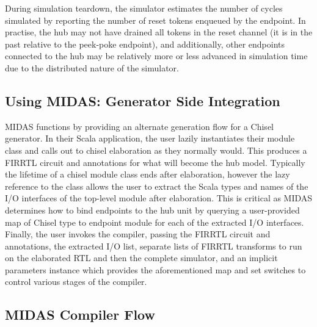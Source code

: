 During simulation teardown, the simulator estimates the number of cycles simulated by
reporting the number of reset tokens enqueued by the endpoint. In practise,
the hub may not have drained all tokens in the reset channel (it is in the
past relative to the peek-poke endpoint), and additionally, other endpoints
connected to the hub may be relatively more or less advanced in simulation
time due to the distributed nature of the simulator.

\subsection{Using MIDAS: Generator Side Integration}

MIDAS functions by providing an alternate generation flow for a Chisel
generator.  In their Scala application, the user lazily instantiates their
module class and calls out to chisel elaboration as they normally would.
This produces a FIRRTL circuit and annotations for what will become the hub
model.  Typically the lifetime of a chisel module class ends after
elaboration, however the lazy reference to the class allows the user to
extract the Scala types and names of the I/O interfaces of the top-level
module after elaboration. This is critical as MIDAS determines how to bind
endpoints to the hub unit by querying a user-provided map of Chisel type to
endpoint module for each of the extracted I/O interfaces. Finally, the user
invokes the compiler, passing the FIRRTL circuit and annotations, the
extracted I/O list, separate lists of FIRRTL transforms to run on the
elaborated RTL and then the complete simulator, and an implicit parameters
instance which provides the aforementioned map and set switches to control
various stages of the compiler.

\subsection{MIDAS Compiler Flow}

